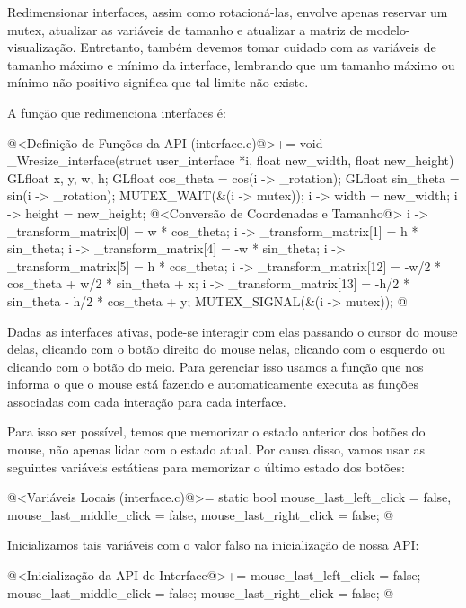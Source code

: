 
Redimensionar interfaces, assim como rotacioná-las, envolve apenas
reservar um mutex, atualizar as variáveis de tamanho e atualizar a
matriz de modelo-visualização. Entretanto, também devemos tomar
cuidado com as variáveis de tamanho máximo e mínimo da interface,
lembrando que um tamanho máximo ou mínimo não-positivo significa que
tal limite não existe.

A função que redimenciona interfaces é:

\iniciocodigo
@<Definição de Funções da API (interface.c)@>+=
void _Wresize_interface(struct user_interface *i,
                        float new_width, float new_height){
  GLfloat x, y, w, h;
  GLfloat cos_theta = cos(i -> _rotation);
  GLfloat sin_theta = sin(i -> _rotation);
  MUTEX_WAIT(&(i -> mutex));
  i -> width = new_width;
  i -> height = new_height;
  @<Conversão de Coordenadas e Tamanho@>
  i -> _transform_matrix[0] = w * cos_theta;
  i -> _transform_matrix[1] = h * sin_theta;
  i -> _transform_matrix[4] = -w * sin_theta;
  i -> _transform_matrix[5] = h * cos_theta;
  i -> _transform_matrix[12] = -w/2 * cos_theta + w/2 * sin_theta + x;
  i -> _transform_matrix[13] = -h/2 * sin_theta - h/2 * cos_theta + y;
  MUTEX_SIGNAL(&(i -> mutex));
}
@
\fimcodigo


Dadas as interfaces ativas, pode-se interagir com elas passando o
cursor do mouse delas, clicando com o botão direito do mouse nelas,
clicando com o esquerdo ou clicando com o botão do meio. Para
gerenciar isso usamos a função  que
nos informa o que o mouse está fazendo e automaticamente executa as
funções associadas com cada interação para cada interface.

Para isso ser possível, temos que memorizar o estado anterior dos
botões do mouse, não apenas lidar com o estado atual. Por causa disso,
vamos usar as seguintes variáveis estáticas para memorizar o último
estado dos botões:

\iniciocodigo
@<Variáveis Locais (interface.c)@>=
static bool mouse_last_left_click = false, mouse_last_middle_click = false,
  mouse_last_right_click = false;
@
\fimcodigo

Inicializamos tais variáveis com o valor falso na inicialização de
nossa API:

\iniciocodigo
@<Inicialização da API de Interface@>+=
mouse_last_left_click = false;
mouse_last_middle_click = false;
mouse_last_right_click = false;
@
\fimcodigo

